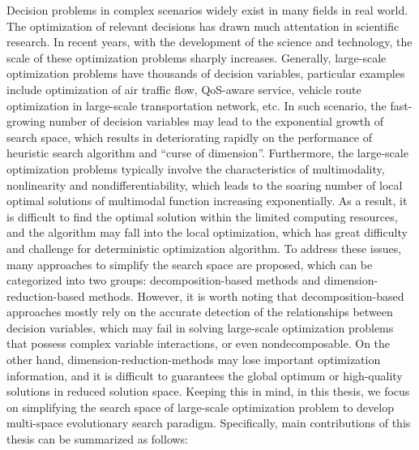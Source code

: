\begin{eabstract}	%
Decision problems in complex scenarios widely exist in many fields in real world. The optimization of relevant decisions has drawn much attentation in scientific research. In recent years, with the development of the science and technology, the scale of these optimization problems sharply increases. Generally, large-scale optimization problems have thousands of decision variables, particular examples include optimization of air traffic flow, QoS-aware service, vehicle route optimization in large-scale transportation network, etc. In such scenario, the fast-growing number of decision variables may lead to the exponential growth of search space, which results in deteriorating rapidly on the performance of heuristic search algorithm and “curse of dimension”. Furthermore, the large-scale optimization problems typically involve the characteristics of multimodality, nonlinearity and nondifferentiability, which leads to the soaring number of local optimal solutions of multimodal function increasing exponentially. As a result, it is difficult to find the optimal solution within the limited computing resources, and the algorithm may fall into the local optimization, which has great difficulty and challenge for deterministic optimization algorithm. To address these issues, many approaches to simplify the search space are proposed, which can be categorized into two groups: decomposition-based methods and dimension-reduction-based methods. However, it is worth noting that decomposition-based approaches mostly rely on the accurate detection of the relationships between decision variables, which may fail in solving large-scale optimization problems that possess complex variable interactions, or even nondecomposable. On the other hand, dimension-reduction-methods may lose important optimization information, and it is difficult to guarantees the global optimum or high-quality solutions in reduced solution space. Keeping this in mind, in this thesis, we focus on simplifying the search space of large-scale optimization problem to develop multi-space evolutionary search paradigm. Specifically, main contributions of this thesis can be summarized as follows:

\end{eabstract}

